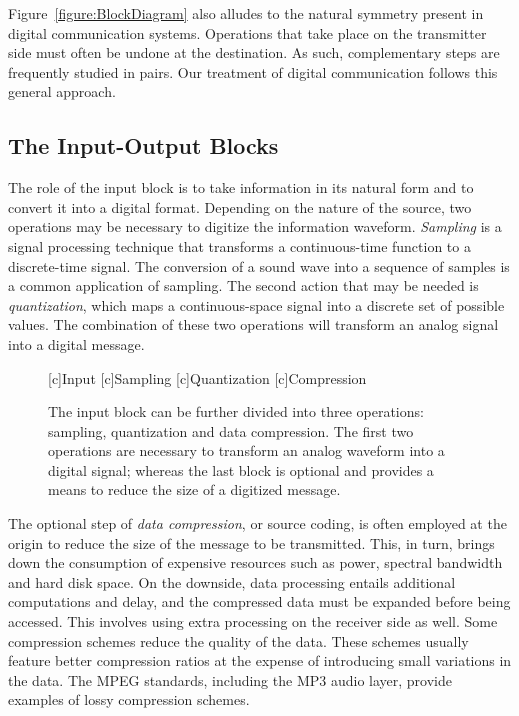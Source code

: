 Figure~\ref{figure:BlockDiagram} also alludes to the natural symmetry present in digital communication systems.
Operations that take place on the transmitter side must often be undone at the destination.
As such, complementary steps are frequently studied in pairs.
Our treatment of digital communication follows this general approach.


\subsection{The Input-Output Blocks}

The role of the input block is to take information in its natural form and to convert it into a digital format.
Depending on the nature of the source, two operations may be necessary to digitize the information waveform.
\emph{Sampling} is a signal processing technique that transforms a continuous-time function to a discrete-time signal.
The conversion of a sound wave into a sequence of samples is a common application of sampling.
The second action that may be needed is \emph{quantization}, which maps a continuous-space signal into a discrete set of possible values.
The combination of these two operations will transform an analog signal into a digital message.

\begin{figure}[htbp]
\begin{center}
\begin{psfrags}
[c]{Input}
[c]{Sampling}
[c]{Quantization}
[c]{Compression}
\end{psfrags}
\end{center}
\caption{The input block can be further divided into three operations: sampling, quantization and data compression.
The first two operations are necessary to transform an analog waveform into a digital signal; whereas the last block is optional and provides a means to reduce the size of a digitized message.}
\label{figure:BlockInput}
\end{figure}

The optional step of \emph{data compression}, or source coding, is often employed at the origin to reduce the size of the message to be transmitted.
This, in turn, brings down the consumption of expensive resources such as power, spectral bandwidth and hard disk space.
On the downside, data processing entails additional computations and delay, and the compressed data must be expanded before being accessed.
This involves using extra processing on the receiver side as well.
Some compression schemes reduce the quality of the data.
These schemes usually feature better compression ratios at the expense of introducing small variations in the data.
The MPEG standards, including the MP3 audio layer, provide examples of lossy compression schemes.

